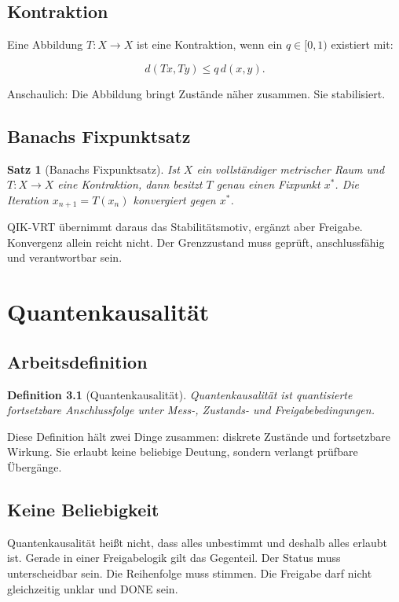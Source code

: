 \documentclass[11pt,a4paper,oneside]{book}
\newtheorem{definition}{Definition}[chapter]
\newtheorem{satz}{Satz}[chapter]
\begin{document}
\section{Kontraktion}

Eine Abbildung \(T:X\to X\) ist eine Kontraktion, wenn ein \(q\in[0,1)\) existiert mit:

\[
d(Tx,Ty)\leq q\,d(x,y).
\]

Anschaulich: Die Abbildung bringt Zustände näher zusammen. Sie stabilisiert.

\section{Banachs Fixpunktsatz}

\begin{satz}[Banachs Fixpunktsatz]
Ist \(X\) ein vollständiger metrischer Raum und \(T:X\to X\) eine Kontraktion, dann besitzt \(T\) genau einen Fixpunkt \(x^*\). Die Iteration \(x_{n+1}=T(x_n)\) konvergiert gegen \(x^*\).
\end{satz}

QIK-VRT übernimmt daraus das Stabilitätsmotiv, ergänzt aber Freigabe. Konvergenz allein reicht nicht. Der Grenzzustand muss geprüft, anschlussfähig und verantwortbar sein.

\chapter{Quantenkausalität}

\section{Arbeitsdefinition}

\begin{definition}[Quantenkausalität]
Quantenkausalität ist quantisierte fortsetzbare Anschlussfolge unter Mess-, Zustands- und Freigabebedingungen.
\end{definition}

Diese Definition hält zwei Dinge zusammen: diskrete Zustände und fortsetzbare Wirkung. Sie erlaubt keine beliebige Deutung, sondern verlangt prüfbare Übergänge.

\section{Keine Beliebigkeit}

Quantenkausalität heißt nicht, dass alles unbestimmt und deshalb alles erlaubt ist. Gerade in einer Freigabelogik gilt das Gegenteil. Der Status muss unterscheidbar sein. Die Reihenfolge muss stimmen. Die Freigabe darf nicht gleichzeitig unklar und DONE sein.
\end{document}
